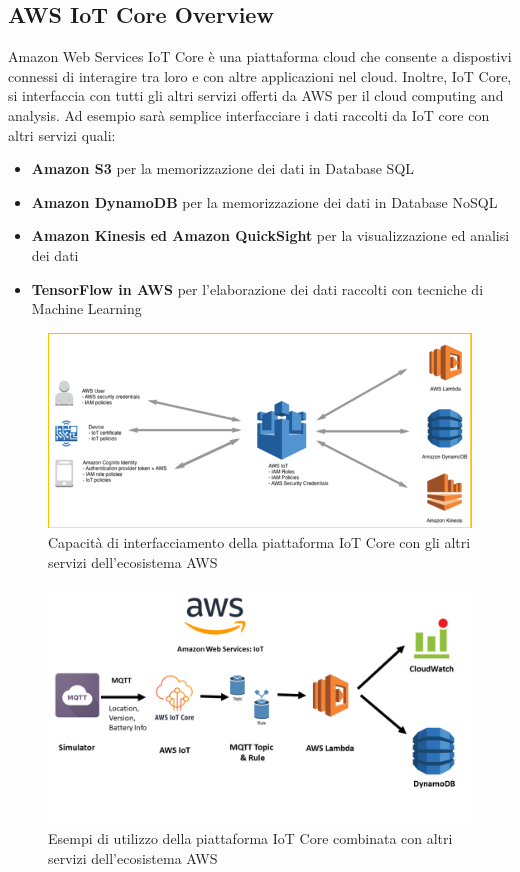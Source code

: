 \subsection{AWS IoT Core Overview}
\label{sec:iot_core}
Amazon Web Services IoT Core è una piattaforma cloud che consente a dispostivi connessi di interagire tra loro e con altre applicazioni nel cloud. Inoltre, IoT Core, si interfaccia con tutti gli altri servizi offerti da AWS per il cloud computing and analysis. Ad esempio sarà semplice interfacciare i dati raccolti da IoT core con altri servizi quali:
\begin{itemize}
	\item \textbf{Amazon S3} per la memorizzazione dei dati in Database SQL
	\item \textbf{Amazon DynamoDB} per la memorizzazione dei dati in Database NoSQL
	\item \textbf{Amazon Kinesis ed Amazon QuickSight} per la visualizzazione ed analisi dei dati
	\item \textbf{TensorFlow in AWS} per l'elaborazione dei dati raccolti con tecniche di Machine Learning
\end{itemize}
\begin{figure}
	\begin{center}
		\includegraphics[width=0.9\columnwidth]{images/aws_iot_core}
	\end{center}
	\caption{Capacità di interfacciamento della piattaforma IoT Core con gli altri servizi dell'ecosistema AWS}
	\label{fig:aws_iot_core}
\end{figure}
\begin{figure}
	\begin{center}
		\includegraphics[width=0.9\columnwidth]{images/aws_iot_core_2}
	\end{center}
	\caption{Esempi di utilizzo della piattaforma IoT Core combinata con altri servizi dell'ecosistema AWS}
	\label{fig:aws_iot_core_2}
\end{figure}
